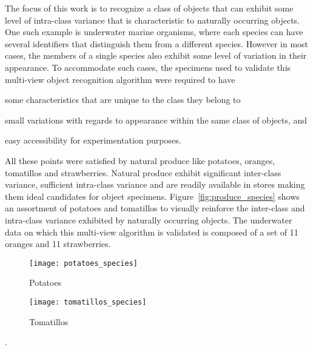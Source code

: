 The focus of this work is to recognize a class of objects that can exhibit some level of intra-class variance that is characteristic to naturally occurring objects. One such example is underwater marine organisms, where each species can have several identifiers that distinguish them from a different species. However in most cases, the members of a single species also exhibit some level of variation in their appearance. To accommodate such cases, the specimens used to validate this multi-view object recognition algorithm were required to have \begin{enumerate*}[label=(\roman*)]  \item some characteristics that are unique to the class they belong to \item small variations with regards to appearance within the same class of objects, and \item easy accessibility for experimentation purposes. \end{enumerate*} All these points were satisfied by natural produce like potatoes, oranges, tomatillos and strawberries. Natural produce exhibit significant inter-class variance, sufficient intra-class variance and are 
readily 
available in stores making them ideal 
candidates for object specimens. Figure~\ref{fig:produce_species} shows an assortment of potatoes and tomatillos to visually reinforce the inter-class and intra-class variance exhibited by naturally occurring objects. The underwater data on which this multi-view algorithm is validated is composed of a set of 11 oranges and 11 strawberries.
%
\begin{figure*}
  \centering
  \begin{subfigure}[]{0.45\textwidth}
      \texttt{[image: potatoes\_species]}
      \caption{Potatoes}
      \label{fig:potato_species}
  \end{subfigure}
  \begin{subfigure}[]{0.45\textwidth}
      \texttt{[image: tomatillos\_species]}
      \caption{Tomatillos}
      \label{fig:tomatillo_species}
  \end{subfigure}
\caption[Illustration of the inter-class and intra-class variance exhibited by naturally occurring objects]
{An illustration of the inter-class and intra-class variance exhibited by naturally occurring objects like 
potatoes () and tomatillos ()}.
\label{fig:produce_species}
\end{figure*}	
%
